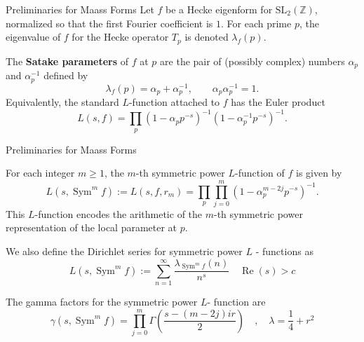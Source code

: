 \documentclass{beamer}
\def\Sym{\operatorname{Sym}}
\def\Re{\operatorname{Re}}
\begin{document}



\begin{frame}{Preliminaries for Maass Forms}
   Let $f$ be a Hecke eigenform  for $\mathrm{SL}_2(\mathbb{Z})$, normalized so that the first Fourier coefficient is $1$. For each prime $p$, the eigenvalue of $f$ for the Hecke operator $T_p$ is denoted $\lambda_f(p)$.

The \textbf{Satake parameters} of $f$ at $p$ are the pair of (possibly complex) numbers $\alpha_p$ and $\alpha_p^{-1}$ defined by
\[
\lambda_f(p) = \alpha_p + \alpha_p^{-1}, \qquad \alpha_p \alpha_p^{-1} = 1.
\]
Equivalently, the standard $L$-function attached to $f$ has the Euler product
\[
L(s, f) = \prod_p \left(1 - \alpha_p p^{-s}\right)^{-1} \left(1 - \alpha_p^{-1} p^{-s}\right)^{-1}.
\]


\end{frame}
\begin{frame}{Preliminaries for Maass Forms}
\begin{definition}
For each integer $m \geq 1$, the $m$-th symmetric power $L$-function of $f$ is given by
\[
L(s, \operatorname{Sym}^m f) := L(s,f,r_m) = \prod_p \prod_{j=0}^m (1 - \alpha_p^{m - 2j} p^{-s})^{-1}.
\]
This $L$-function encodes the arithmetic of the $m$-th symmetric power representation of the local parameter at $p$.
    
\end{definition} 
   We also define the Dirichlet series for  symmetric power $L$ - functions as 
\[
L(s,\Sym^mf):=\sum_{n=1}^\infty \frac{\lambda_{\Sym^mf}(n)}{n^s} \quad \Re(s)> c
\]

The gamma factors for the symmetric power $L$- function are 
\[
\gamma(s,\Sym^m f )= \prod_{j=0}^m \Gamma(\frac{s-(m-2j)ir}{2}) \quad,\quad  \lambda=\frac{1}{4}+r^2
\]    
\end{frame}
\end{document}
